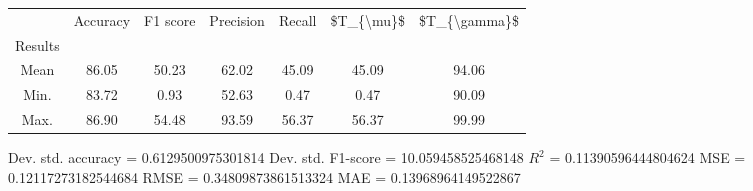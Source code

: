 \begin{tabular}{|c|c|c|c|c|c|c|}
\toprule
{} &  Accuracy &  F1 score &  Precision &  Recall &  \$T\_\{\textbackslash mu\}\$ &  \$T\_\{\textbackslash gamma\}\$ \\
Results &           &           &            &         &            &               \\
\hline
Mean    &     86.05 &     50.23 &      62.02 &   45.09 &      45.09 &         94.06 \\
Min.    &     83.72 &      0.93 &      52.63 &    0.47 &       0.47 &         90.09 \\
Max.    &     86.90 &     54.48 &      93.59 &   56.37 &      56.37 &         99.99 \\
\bottomrule
\end{tabular}

 Dev. std. accuracy = 0.6129500975301814
 Dev. std. F1-score = 10.059458525468148
 $R^2$ = 0.11390596444804624
 MSE = 0.12117273182544684
 RMSE = 0.34809873861513324
 MAE = 0.13968964149522867